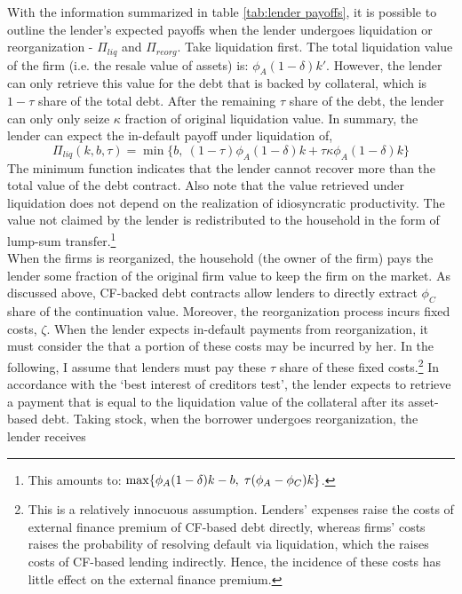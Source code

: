 \documentclass[12pt]{article}
\begin{document}
\noindent With the information summarized in table \ref{tab:lender payoffs}, it is possible to outline the lender's expected payoffs when the lender undergoes liquidation or reorganization - $\Pi_{liq}$ and $\Pi_{reorg}$. Take liquidation first. The total liquidation value of the firm (i.e. the resale value of assets) is: $\phi_A (1-\delta) k'$. However, the lender can only retrieve this value for the  debt that is backed by collateral, which is $1-\tau$ share of the total debt. After the remaining $\tau$ share of the debt, the lender can only only seize $\kappa$ fraction of original liquidation value. In summary, the lender can expect the in-default payoff under liquidation of, 
\begin{equation} \label{eq:P_liq}
   \Pi_{liq}(k,b,\tau) = \min\{b, \ (1-\tau) \phi_A (1-\delta) k +\tau \kappa \phi_A  (1-\delta) k \}
\end{equation}
The minimum function indicates that the lender cannot recover more than the total value of the debt contract. Also note that the value retrieved under liquidation does not depend on the realization of idiosyncratic productivity. The value not claimed by the lender is redistributed to the household in the form of lump-sum transfer.\footnote{This amounts to: $ \max \{\phi_A (1-\delta) k - b, \hspace{1mm} \tau (\phi_A-\phi_C) k  \} $.} \vspace{3mm} \\
When the firms is reorganized, the household (the owner of the firm) pays the lender some fraction of the original firm value to keep the firm on the market. As discussed above, CF-backed debt contracts allow lenders to directly extract $\phi_C$ share of the continuation value. Moreover, the reorganization process incurs fixed costs, $\zeta$. When the lender expects in-default payments from reorganization, it must consider the that a portion of these costs may be incurred by her. In the following, I assume that lenders must pay these $\tau$ share of these fixed costs.\footnote{This is a relatively innocuous assumption. Lenders' expenses raise the costs of external finance premium of CF-based debt directly, whereas firms' costs raises the probability of resolving default via liquidation, which the raises costs of CF-based lending indirectly. Hence, the incidence of these costs has little effect on the external finance premium.} In accordance with the `best interest of creditors test', the lender expects to retrieve a payment that is equal to the liquidation value of the collateral after its asset-based debt. Taking stock, when the borrower undergoes reorganization, the lender receives
\end{document}
